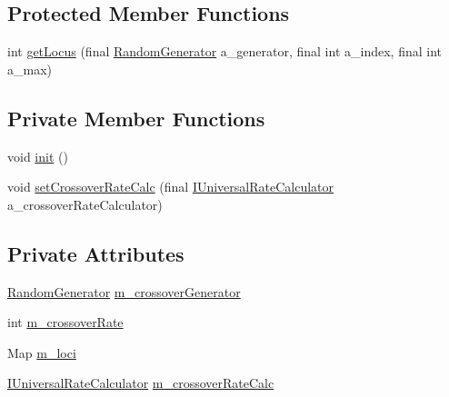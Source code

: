 \subsection*{Protected Member Functions}
\begin{DoxyCompactItemize}
\item 
int \hyperlink{classorg_1_1jgap_1_1impl_1_1_averaging_crossover_operator_ae6166be762fcee1c05d90279bf8c47d2}{get\-Locus} (final \hyperlink{interfaceorg_1_1jgap_1_1_random_generator}{Random\-Generator} a\-\_\-generator, final int a\-\_\-index, final int a\-\_\-max)
\end{DoxyCompactItemize}
\subsection*{Private Member Functions}
\begin{DoxyCompactItemize}
\item 
void \hyperlink{classorg_1_1jgap_1_1impl_1_1_averaging_crossover_operator_a3bd2658bf965ed59f61d5ae352151866}{init} ()
\item 
void \hyperlink{classorg_1_1jgap_1_1impl_1_1_averaging_crossover_operator_a00e8ac596774907b7fcb8d887ea0fe5e}{set\-Crossover\-Rate\-Calc} (final \hyperlink{interfaceorg_1_1jgap_1_1_i_universal_rate_calculator}{I\-Universal\-Rate\-Calculator} a\-\_\-crossover\-Rate\-Calculator)
\end{DoxyCompactItemize}
\subsection*{Private Attributes}
\begin{DoxyCompactItemize}
\item 
\hyperlink{interfaceorg_1_1jgap_1_1_random_generator}{Random\-Generator} \hyperlink{classorg_1_1jgap_1_1impl_1_1_averaging_crossover_operator_a613f7b49028a51994326f663f312f4a3}{m\-\_\-crossover\-Generator}
\item 
int \hyperlink{classorg_1_1jgap_1_1impl_1_1_averaging_crossover_operator_ab3cb82ebc4ff8b1a325bf347105621d5}{m\-\_\-crossover\-Rate}
\item 
Map \hyperlink{classorg_1_1jgap_1_1impl_1_1_averaging_crossover_operator_ab8eb15d0c67e895208ff78dd426f5213}{m\-\_\-loci}
\item 
\hyperlink{interfaceorg_1_1jgap_1_1_i_universal_rate_calculator}{I\-Universal\-Rate\-Calculator} \hyperlink{classorg_1_1jgap_1_1impl_1_1_averaging_crossover_operator_a4f84d3a8075f22f84f42db7f2faa66f0}{m\-\_\-crossover\-Rate\-Calc}
\end{DoxyCompactItemize}
